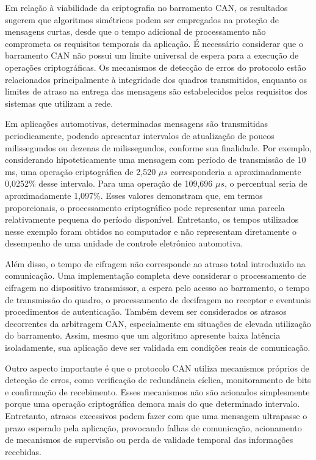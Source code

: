 Em relação à viabilidade da criptografia no barramento CAN, os resultados sugerem que algoritmos simétricos podem ser empregados na proteção de mensagens curtas, desde que o tempo adicional de processamento não comprometa os requisitos temporais da aplicação. É necessário considerar que o barramento CAN não possui um limite universal de espera para a execução de operações criptográficas. Os mecanismos de detecção de erros do protocolo estão relacionados principalmente à integridade dos quadros transmitidos, enquanto os limites de atraso na entrega das mensagens são estabelecidos pelos requisitos dos sistemas que utilizam a rede.

Em aplicações automotivas, determinadas mensagens são transmitidas periodicamente, podendo apresentar intervalos de atualização de poucos milissegundos ou dezenas de milissegundos, conforme sua finalidade. Por exemplo, considerando hipoteticamente uma mensagem com período de transmissão de 10 ms, uma operação criptográfica de 2,520 $\mu s$ corresponderia a aproximadamente 0,0252\% desse intervalo. Para uma operação de 109,696 $\mu s$, o percentual seria de aproximadamente 1,097\%. Esses valores demonstram que, em termos proporcionais, o processamento criptográfico pode representar uma parcela relativamente pequena do período disponível. Entretanto, os tempos utilizados nesse exemplo foram obtidos no computador e não representam diretamente o desempenho de uma unidade de controle eletrônico automotiva.

Além disso, o tempo de cifragem não corresponde ao atraso total introduzido na comunicação. Uma implementação completa deve considerar o processamento de cifragem no dispositivo transmissor, a espera pelo acesso ao barramento, o tempo de transmissão do quadro, o processamento de decifragem no receptor e eventuais procedimentos de autenticação. Também devem ser considerados os atrasos decorrentes da arbitragem CAN, especialmente em situações de elevada utilização do barramento. Assim, mesmo que um algoritmo apresente baixa latência isoladamente, sua aplicação deve ser validada em condições reais de comunicação.

Outro aspecto importante é que o protocolo CAN utiliza mecanismos próprios de detecção de erros, como verificação de redundância cíclica, monitoramento de bits e confirmação de recebimento. Esses mecanismos não são acionados simplesmente porque uma operação criptográfica demora mais do que determinado intervalo. Entretanto, atrasos excessivos podem fazer com que uma mensagem ultrapasse o prazo esperado pela aplicação, provocando falhas de comunicação, acionamento de mecanismos de supervisão ou perda de validade temporal das informações recebidas.

